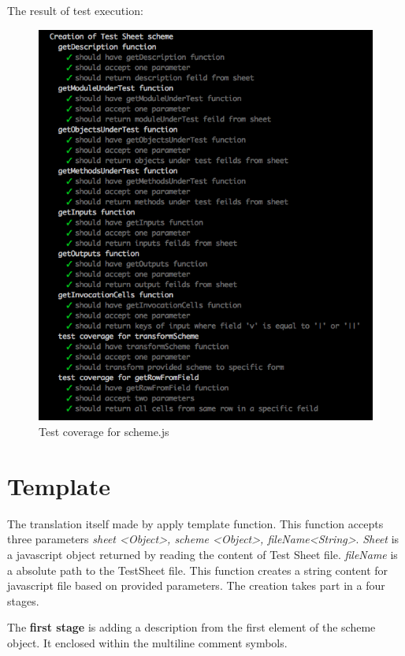 The result of test execution:
\begin{figure}[H]
	\centering
	\includegraphics[width=\linewidth]{grafiken/testScheme.png}
	\caption{Test coverage for scheme.js}
	\label{fig:testScheme}
\end{figure}


\section{Template}
The translation itself made by apply template function. This function accepts three parameters \textit{sheet <Object>, scheme <Object>, fileName<String>}. \textit{Sheet} is a javascript object returned by reading the content of Test Sheet file. \textit{fileName} is a absolute path to the TestSheet file. This function creates a string content for javascript file based on provided parameters. The creation takes part in a four stages. 

The \textbf{first stage} is adding a description from the first element of the scheme object. It enclosed within the multiline comment symbols.

